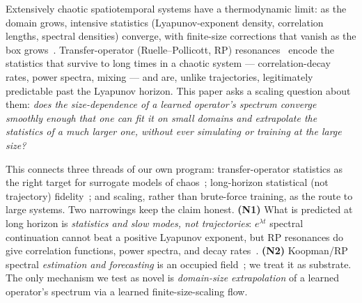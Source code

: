 \documentclass[11pt]{article}
\begin{document}
Extensively chaotic spatiotemporal systems have a thermodynamic limit: as the
domain grows, intensive statistics (Lyapunov-exponent density, correlation
lengths, spectral densities) converge, with finite-size corrections that vanish
as the box grows~\citep{cross1993,egolf1994,manneville1985}. Transfer-operator
(Ruelle--Pollicott, RP) resonances~\citep{ruelle1986,pollicott1985} encode the
statistics that survive to long times in a chaotic system --- correlation-decay
rates, power spectra, mixing --- and are, unlike trajectories, legitimately
predictable past the Lyapunov horizon. This paper asks a scaling question about
them: \emph{does the size-dependence of a learned operator's spectrum converge
smoothly enough that one can fit it on small domains and extrapolate the
statistics of a much larger one, without ever simulating or training at the
large size?}

This connects three threads of our own program: transfer-operator statistics as
the right target for surrogate models of chaos~\citep{howe2026dbar}; long-horizon
statistical (not trajectory) fidelity~\citep{howe2026tpp}; and scaling, rather
than brute-force training, as the route to large systems. Two narrowings keep the
claim honest. \textbf{(N1)} What is predicted at long horizon is
\emph{statistics and slow modes, not trajectories}: $e^{\lambda t}$ spectral
continuation cannot beat a positive Lyapunov exponent, but RP resonances do give
correlation functions, power spectra, and decay rates~\citep{chekroun2020rp1}.
\textbf{(N2)} Koopman/RP spectral \emph{estimation and forecasting} is an
occupied field~\citep{chekroun2020rp1,arbabi2017hankel,das2019delay,williams2015edmd};
we treat it as substrate. The only mechanism we test as novel is
\emph{domain-size extrapolation} of a learned operator's spectrum via a learned
finite-size-scaling flow.
\end{document}
